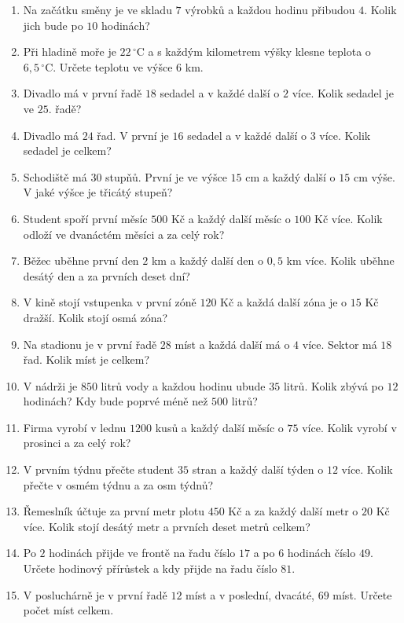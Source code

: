\documentclass[11pt,a4paper]{article}
\begin{document}
\begin{enumerate}[resume]
    \item Na začátku směny je ve skladu $7$ výrobků a každou hodinu přibudou $4$. Kolik jich bude po $10$ hodinách?

    \item Při hladině moře je $22\,^\circ\mathrm{C}$ a s každým kilometrem výšky klesne teplota o $6{,}5\,^\circ\mathrm{C}$. Určete teplotu ve výšce $6$ km.

    \item Divadlo má v první řadě $18$ sedadel a v každé další o $2$ více. Kolik sedadel je ve $25.$ řadě?

    \item Divadlo má $24$ řad. V první je $16$ sedadel a v každé další o $3$ více. Kolik sedadel je celkem?

    \item Schodiště má $30$ stupňů. První je ve výšce $15$ cm a každý další o $15$ cm výše. V jaké výšce je třicátý stupeň?

    \item Student spoří první měsíc $500$ Kč a každý další měsíc o $100$ Kč více. Kolik odloží ve dvanáctém měsíci a za celý rok?

    \item Běžec uběhne první den $2$ km a každý další den o $0{,}5$ km více. Kolik uběhne desátý den a za prvních deset dní?

    \item V kině stojí vstupenka v první zóně $120$ Kč a každá další zóna je o $15$ Kč dražší. Kolik stojí osmá zóna?

    \item Na stadionu je v první řadě $28$ míst a každá další má o $4$ více. Sektor má $18$ řad. Kolik míst je celkem?

    \item V nádrži je $850$ litrů vody a každou hodinu ubude $35$ litrů. Kolik zbývá po $12$ hodinách? Kdy bude poprvé méně než $500$ litrů?

    \item Firma vyrobí v lednu $1200$ kusů a každý další měsíc o $75$ více. Kolik vyrobí v prosinci a za celý rok?

    \item V prvním týdnu přečte student $35$ stran a každý další týden o $12$ více. Kolik přečte v osmém týdnu a za osm týdnů?

    \item Řemeslník účtuje za první metr plotu $450$ Kč a za každý další metr o $20$ Kč více. Kolik stojí desátý metr a prvních deset metrů celkem?

    \item Po $2$ hodinách přijde ve frontě na řadu číslo $17$ a po $6$ hodinách číslo $49$. Určete hodinový přírůstek a kdy přijde na řadu číslo $81$.

    \item V posluchárně je v první řadě $12$ míst a v poslední, dvacáté, $69$ míst. Určete počet míst celkem.
\end{enumerate}
\end{document}
